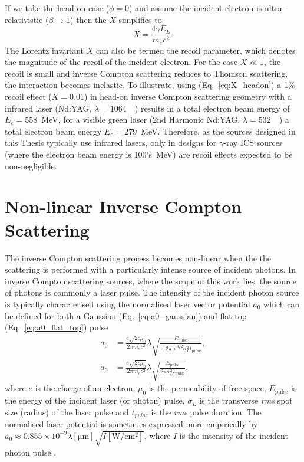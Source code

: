 \documentclass[../main.tex]{subfiles}
\begin{document}
If we take the head-on case ($\phi = 0$) and  assume the incident electron is ultra-relativistic ($\beta \rightarrow 1$) then the $X$ simplifies to 
\begin{equation}
X = \frac{4\gamma E_{L}}{m_{e}c^{2}}.
\label{eq:X_headon}
\end{equation}
The Lorentz invariant $X$ can also be termed the recoil parameter, which denotes the magnitude of the recoil of the incident electron. For the case $X \ll 1$, the recoil is small and inverse Compton scattering reduces to Thomson scattering, the interaction becomes inelastic. To illustrate, using (Eq.~\ref{eq:X_headon}) a 1\% recoil effect ($X = 0.01$) in head-on inverse Compton scattering geometry with a infrared laser (Nd:YAG, $\lambda = 1064$~\si{\nano\metres}) results in a total electron beam energy of $E_{e} = 558$~\si{\mega\electronvolt}, for a visible green laser (2nd Harmonic Nd:YAG, $\lambda = 532$~\si{\nano\metres}) a total electron beam energy $E_{e} = 279$~\si{\mega\electronvolt}. Therefore, as the sources designed in this Thesis typically use infrared lasers, only in designs for $\gamma$-ray ICS sources (where the electron beam energy is 100's~\si{\mega\electronvolt}) are recoil effects expected to be non-negligible.     

\section{Non-linear Inverse Compton Scattering}

The inverse Compton scattering process becomes non-linear when the the scattering is performed with a particularly intense source of incident photons. In inverse Compton scattering sources, where the scope of this work lies, the source of photons is commonly a laser pulse. The intensity of the incident photon source is typically characterised using the normalised laser vector potential $a_{0}$ which can be defined for both a Gaussian (Eq.~\ref{eq:a0_gaussian}) and flat-top (Eq.~\ref{eq:a0_flat_top}) pulse \cite{terzic2019improving}
\begin{align}
a_{0} &= \frac{e\sqrt{2c\mu_{0}}}{2\pi m_{e}c^{2}}\lambda\sqrt{\frac{E_{\mathrm{pulse}}}{\left(2\pi\right)^{3/2}\sigma_{L}^{2}t_{\mathrm{pulse}}}},
\label{eq:a0_gaussian} \\
a_{0} &= \frac{e\sqrt{2c\mu_{0}}}{2\pi m_{e}c^{2}}\lambda\sqrt{\frac{E_{\mathrm{pulse}}}{2\pi\sigma_{L}^{2}t_{\mathrm{pulse}}}},
\label{eq:a0_flat_top}
\end{align}
where $e$ is the charge of an electron, $\mu_{0}$ is the permeability of free space, $E_{\mathrm{pulse}}$ is the energy of the incident laser (or photon) pulse, $\sigma_{L}$ is the transverse \textit{rms} spot size (radius) of the laser pulse and $t_{pulse}$ is the \textit{rms} pulse duration. The normalised laser potential is sometimes expressed more empirically by $a_{0} \approx 0.855\times 10^{-9} \lambda\left[\mathrm{\mu m}\right]\sqrt{I\left[\mathrm{W/cm^{2}}\right]}$, where $I$ is the intensity of the incident photon pulse \cite{li2004high}.
\end{document}
